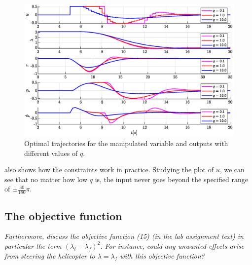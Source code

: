 \documentclass[../main.tex]{subfiles}
\begin{document}
\begin{figure}[h]
	\centering
	\includegraphics[width=\linewidth]{figures/lab2_optimal_u}
	\caption{Optimal trajectories for the manipulated variable and outputs with different values of $q$.}
	\label{fig:lab2_optimalu}
\end{figure}

 also shows how the constraints work in practice. Studying the plot of $ u $, we can see that no matter how low $ q $ is, the input never goes beyond the specified range of $ \pm\frac{30}{180} \pi $.

\subsection{The objective function}
\textit{Furthermore, discuss the objective function (15) (in the lab assignment text) in particular the term $(\lambda_i-\lambda_f )^2$. For instance, could any unwanted effects arise from steering the helicopter to $\lambda =\lambda_f$ with this objective function?}
\end{document}
